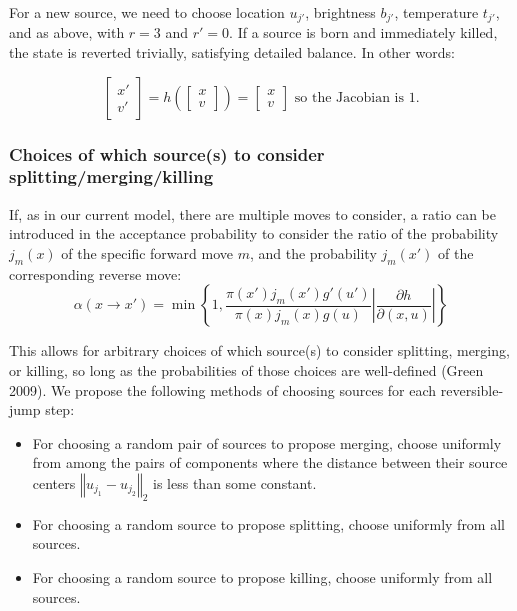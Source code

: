 \documentclass[11pt]{article}
\begin{document}
For a new source, we need to choose location $u_{j'}$, brightness
$b_{j'}$, temperature $t_{j'}$, and as above, with $r=3$ and $r'=0$. If a source is
born and immediately killed, the state is reverted trivially, satisfying
detailed balance. In other words:

\[
\begin{bmatrix}x'\\
v'
\end{bmatrix}=h\left(\begin{bmatrix}x\\
v
\end{bmatrix}\right)=\begin{bmatrix}x\\
v
\end{bmatrix}\mbox{ so the Jacobian is }1.
\]



\subsubsection{Choices of which source(s) to consider splitting/merging/killing\label{sub:proposal-choice}}

If, as in our current model, there are multiple moves to consider,
a ratio can be introduced in the acceptance probability to consider
the ratio of the probability $j_{m}\left(x\right)$ of the specific
forward move $m$, and the probability $j_{m}\left(x'\right)$ of
the corresponding reverse move:
\[
\alpha\left(x\to x'\right)=\min\left\{ 1,\frac{\pi\left(x'\right)j_{m}\left(x'\right)g'\left(u'\right)}{\pi\left(x\right)j_{m}\left(x\right)g\left(u\right)}\left|\frac{\partial h}{\partial\left(x,u\right)}\right|\right\} 
\]


This allows for arbitrary choices of which source(s) to consider splitting,
merging, or killing, so long as the probabilities of those choices
are well-defined (Green 2009). We propose the following methods of
choosing sources for each reversible-jump step:
\begin{itemize}
\item For choosing a random pair of sources to propose merging, choose uniformly
from among the pairs of components where the distance between their
source centers $\left\Vert u_{j_{1}}-u_{j_{2}}\right\Vert _{2}$
is less than some constant. 
\item For choosing a random source to propose splitting, choose uniformly
from all sources.
\item For choosing a random source to propose killing, choose uniformly
from all sources. %

\end{itemize}
\end{document}

